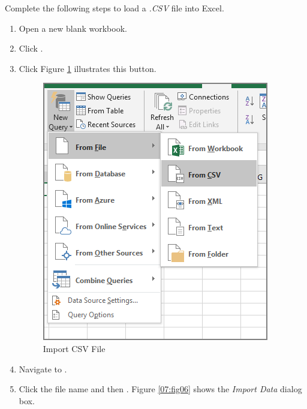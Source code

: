 Complete the following steps to load a \textit{.CSV} file into Excel.

\begin{enumbox}
	\begin{enumerate}
		\item Open a new blank workbook.
		\item {} Click .
		\item {} Click 
		Figure \ref{07:fig05a} illustrates this button.

		\begin{figure}[H]
			\centering
			\includegraphics[width=\maxwidth{.65\linewidth}]{gfx/ch07_fig05a}
			\caption{Import CSV File}
			\label{07:fig05a}
		\end{figure}

		\item Navigate to .
		\item Click the file name and then . Figure \ref{07:fig06} shows the \textit{Import Data} dialog box.


\end{enumerate}
\end{enumbox}
